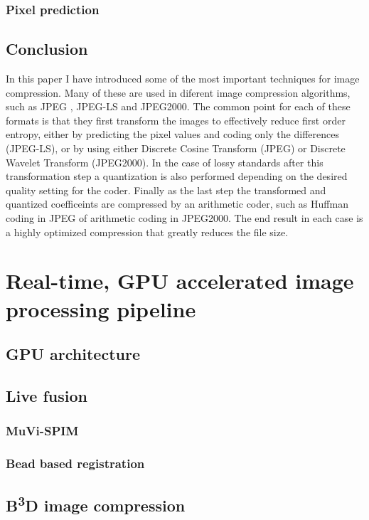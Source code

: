 \documentclass{diploma_style}
\newcommand{\bbbd}{B\textsuperscript{3}D }
\begin{document}
\subsection{Pixel prediction}



\section{Conclusion}
In this paper I have introduced some of the most important techniques for image compression. Many of these are used in diferent image compression algorithms, such as JPEG \cite{pennebaker_jpeg:_1992}, JPEG-LS \cite{weinberger_loco-i_2000} and JPEG2000. The common point for each of these formats is that they first transform the images to effectively reduce first order entropy, either by predicting the pixel values and coding only the differences (JPEG-LS), or by using either Discrete Cosine Transform (JPEG) or Discrete Wavelet Transform (JPEG2000). In the case of lossy standards after this transformation step a quantization is also performed depending on the desired quality setting for the coder. Finally as the last step the transformed and quantized coefficeints are compressed by an arithmetic coder, such as Huffman coding in JPEG of arithmetic coding in JPEG2000. The end result in each case is a highly optimized compression that greatly reduces the file size.



\chapter{Real-time, GPU accelerated image processing pipeline}
\section{GPU architecture}
\section{Live fusion}
	\subsection{MuVi-SPIM}
	\subsection{Bead based registration}
\section{\bbbd image compression}
\end{document}
